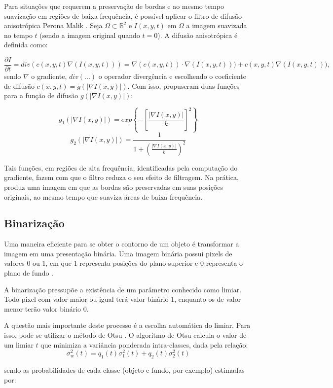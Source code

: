 \documentclass[
	12pt,				%
	oneside,			%
	a4paper,			%
	sumario=tradicional,
	english,			%
	french,				%
	spanish,			%
	brazil,				%
]{abntex2}
\begin{document}
Para situações que requerem a preservação de bordas e ao mesmo tempo suavização em regiões de baixa frequência, é possível aplicar o filtro de difusão anisotrópica Perona Malik \cite{perona_malik}. Seja $\Omega \subset \mathbb{R}^2$ e $I(x, y, t)$ em $\Omega$ a imagem suavizada no tempo $t$ (sendo a imagem original quando $t = 0$). A difusão anisotrópica é definida como:

$$\frac{\partial I}{\partial t} = div(c(x, y, t) \nabla (I(x, y, t))) = \nabla (c(x, y, t)) \cdot \nabla (I(x, y, t))) + c(x, y, t) \nabla (I(x, y, t))),$$ sendo $\nabla$ o gradiente, $div(...)$ o operador divergência e escolhendo o coeficiente de difusão $c(x, y, t) = g(|\nabla I(x, y)|)$. Com isso,  propuseram duas funções para a função de difusão $g(|\nabla I(x, y)|)$:

\[ 
g_1(|\nabla I(x, y)|) = exp \left \{  -\left[ \frac{|\nabla I(x, y)|}{k} \right]^2 \right \}
\]
\[
g_2(|\nabla I(x, y)|) = \frac{1}{1 + \left( \frac{|\nabla I(x, y)|}{k}  \right)^2}
\]

Tais funções, em regiões de alta frequência, identificadas pela computação do gradiente, fazem com que o filtro reduza o seu efeito de filtragem. Na prática, produz uma imagem em que as bordas são preservadas em suas posições originais, ao mesmo tempo que suaviza áreas de baixa frequência. 

\subsection{Binarização}

Uma maneira eficiente para se obter o contorno de um objeto é transformar a imagem em uma presentação binária. Uma imagem binária possui pixels de valores 0 ou 1, em que 1 representa posições do plano superior e 0 representa o plano de fundo \cite{burger}.

A binarização pressupõe a existência de um parâmetro conhecido como limiar. Todo pixel com valor maior ou igual terá valor binário 1, enquanto os de valor menor terão valor binário 0.

A questão mais importante deste processo é a escolha automática do limiar. Para isso, pode-se utilizar o método de Otsu \cite{otsu_method}. O algoritmo de Otsu calcula o valor de um limiar $t$ que minimiza a variância ponderada intra-classes, dada pela relação: 
\[
\sigma_w^2(t) = q_1(t)\sigma_1^2(t)+q_2(t)\sigma_2^2(t)
\]

\noindent sendo as probabilidades de cada classe (objeto e fundo, por exemplo) estimadas por:
\end{document}
